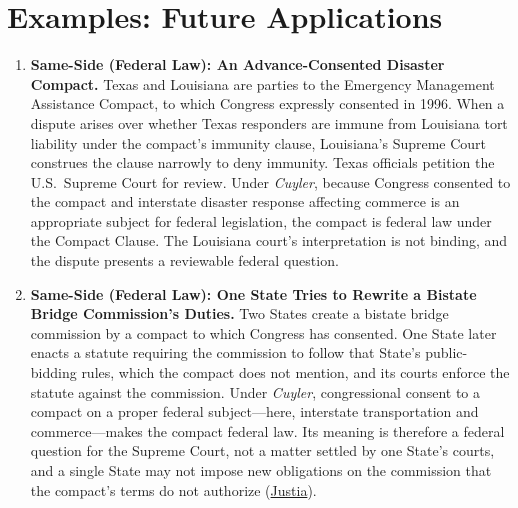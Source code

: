 \documentclass[12pt]{article}
\begin{document}
\section{Examples: Future Applications}
\begin{enumerate}

\item \textbf{Same-Side (Federal Law): An Advance-Consented Disaster Compact.} Texas and Louisiana are parties to the Emergency Management Assistance Compact, to which Congress expressly consented in 1996. When a dispute arises over whether Texas responders are immune from Louisiana tort liability under the compact's immunity clause, Louisiana's Supreme Court construes the clause narrowly to deny immunity. Texas officials petition the U.S.\ Supreme Court for review. Under \textit{Cuyler}, because Congress consented to the compact and interstate disaster response affecting commerce is an appropriate subject for federal legislation, the compact is federal law under the Compact Clause. The Louisiana court's interpretation is not binding, and the dispute presents a reviewable federal question.

\item \textbf{Same-Side (Federal Law): One State Tries to Rewrite a Bistate Bridge Commission's Duties.} Two States create a bistate bridge commission by a compact to which Congress has consented. One State later enacts a statute requiring the commission to follow that State's public-bidding rules, which the compact does not mention, and its courts enforce the statute against the commission. Under \textit{Cuyler}, congressional consent to a compact on a proper federal subject---here, interstate transportation and commerce---makes the compact federal law. Its meaning is therefore a federal question for the Supreme Court, not a matter settled by one State's courts, and a single State may not impose new obligations on the commission that the compact's terms do not authorize (\href{https://supreme.justia.com/cases/federal/us/449/433/}{Justia}).


\end{enumerate}
\end{document}
